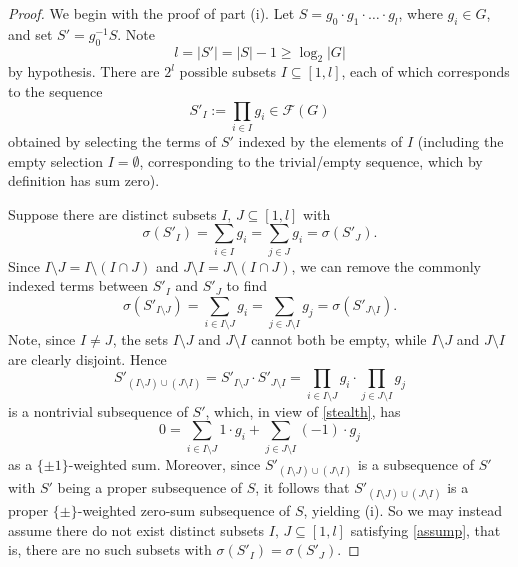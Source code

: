 \documentclass[11pt,reqno]{amsart}
\numberwithin{equation}{section}
\theoremstyle{definition}
\numberwithin{equation}{section}
\begin{document}
\begin{proof}
We begin with the proof of part (i).
Let $S=g_0\cdot g_1\cdot \ldots\cdot g_{l}$, where $g_i\in G$, and set $S'=g_0^{-1}S$.
Note \begin{equation}\label{stuffty}l=|S'|=|S|-1\geq \log_2 |G|\end{equation} by hypothesis.
There are $2^{l}$ possible subsets  $I\subseteq [1,l]$, each of which corresponds to the sequence
$$S'_I:=\prod_{i\in I}g_i\in {\mathcal F}(G)$$ obtained by selecting the terms of $S'$ indexed by the elements of $I$
(including the empty selection $I=\emptyset$, corresponding to the trivial/empty sequence,
which by definition has sum zero).

Suppose there are distinct subsets $I,\,J\subseteq [1,l]$ with
\begin{equation}\sigma(S'_I)=\label{assump}{\sum_{{i\in I}}}g_i={\sum_{{j\in
J}}}g_i=\sigma(S'_J).\end{equation} Since $I\setminus J=I\setminus (I\cap J)$ and
$J\setminus I=J\setminus (I\cap J)$, we can remove the commonly
indexed terms between $S'_I$ and $S'_J$ to find
\begin{equation}\label{stealth}\sigma(S'_{I\setminus J})={\sum_{{i\in I\setminus
J}}}g_i={\sum_{{j\in J\setminus I}}}g_j=\sigma(S'_{J\setminus I}).\end{equation}
Note, since $I\neq J$, the sets $I\setminus J$ and $J\setminus I$
cannot both be empty, while $I\setminus J$ and $J\setminus I$ are
clearly disjoint. Hence
$$S'_{(I\setminus J)\cup (J\setminus I)}=S'_{I\setminus J}\cdot S'_{J\setminus I}
=\prod_{i\in I\setminus J}g_i\cdot\prod_{j\in J\setminus I}g_j$$
is a nontrivial subsequence of $S'$, which, in view of \eqref{stealth},
has $$0={\sum_{{i\in I\setminus J}}}1\cdot g_i+{\sum_{{j\in J\setminus I}}}(-1)\cdot g_j$$
as a $\{\pm 1\}$-weighted sum. Moreover,
since $S'_{(I\setminus J)\cup (J\setminus I)}$ is a subsequence of $S'$ with $S'$ being a proper subsequence of $S$,
 it follows that $S'_{(I\setminus J)\cup (J\setminus I)}$ is a proper $\{\pm\}$-weighted zero-sum subsequence of $S$,
 yielding (i).
 So we may instead assume there do not exist distinct subsets $I,\,J\subseteq [1,l]$ satisfying \eqref{assump}, that is,
 there are no such subsets with $\sigma(S'_I)=\sigma(S'_J)$.


\end{proof}
\end{document}
